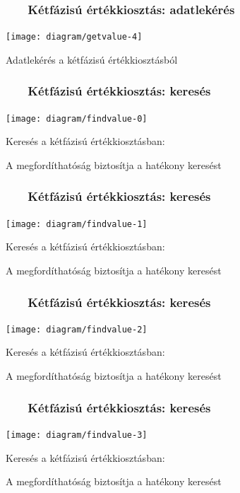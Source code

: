 \documentclass{beamer}
\newcommand{\slidetitle}[2]{\frametitle{{\small #1 ~ \ding{226} ~ } \normalsize #2}}
\begin{document}
\begin{frame}[noframenumbering]
    \slidetitle{\sectionshorttitle}{Kétfázisú értékkiosztás: adatlekérés}
    
    \centering
    
    \texttt{[image: diagram/getvalue-4]}
    
    \hspace{0.7cm}
    
    Adatlekérés a kétfázisú értékkiosztásból
\end{frame}

\begin{frame}
    \slidetitle{\sectionshorttitle}{Kétfázisú értékkiosztás: keresés}
    
    \centering
    
    \texttt{[image: diagram/findvalue-0]}
    
    \vspace{0.5cm}
    
    Keresés a kétfázisú értékkiosztásban: \par
    A megfordíthatóság biztosítja a hatékony keresést
\end{frame}

\begin{frame}[noframenumbering]
    \slidetitle{\sectionshorttitle}{Kétfázisú értékkiosztás: keresés}
    
    \centering
    
    \texttt{[image: diagram/findvalue-1]}
    
    \vspace{0.5cm}
    
    Keresés a kétfázisú értékkiosztásban: \par
    A megfordíthatóság biztosítja a hatékony keresést
\end{frame}

\begin{frame}[noframenumbering]
    \slidetitle{\sectionshorttitle}{Kétfázisú értékkiosztás: keresés}
    
    \centering
    
    \texttt{[image: diagram/findvalue-2]}
    
    \vspace{0.5cm}
    
    Keresés a kétfázisú értékkiosztásban: \par
    A megfordíthatóság biztosítja a hatékony keresést
\end{frame}

\begin{frame}[noframenumbering]
    \slidetitle{\sectionshorttitle}{Kétfázisú értékkiosztás: keresés}
    
    \centering
    
    \texttt{[image: diagram/findvalue-3]}
    
    \vspace{0.5cm}
    
    Keresés a kétfázisú értékkiosztásban: \par
    A megfordíthatóság biztosítja a hatékony keresést
\end{frame}
\end{document}
